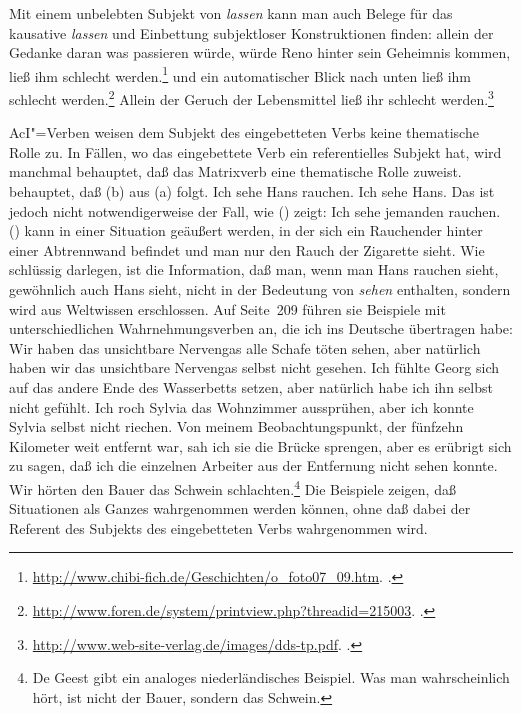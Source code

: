 Mit einem unbelebten Subjekt von \emph{lassen} kann man auch Belege für
das kausative \emph{lassen} und Einbettung subjektloser Konstruktionen finden:
\eal
\ex allein der Gedanke daran was passieren würde, würde Reno hinter sein Geheimnis kommen, ließ ihm schlecht werden.\footnote{%
\url{http://www.chibi-fich.de/Geschichten/o_foto07_09.htm}. .%
}
\ex und ein automatischer Blick nach unten ließ ihm schlecht werden.\footnote{
\url{http://www.foren.de/system/printview.php?threadid=215003}. .
}
\ex Allein der Geruch der Lebensmittel ließ ihr schlecht werden.\footnote{
\url{http://www.web-site-verlag.de/images/dds-tp.pdf}. .
}
\zl


\noindent
\label{page-start-aci-verbs-role}%
AcI"=Verben weisen dem Subjekt des eingebetteten Verbs keine thematische Rolle zu.
In Fällen, wo das eingebettete Verb ein referentielles Subjekt hat, wird manchmal
behauptet, daß das Matrixverb eine thematische Rolle zuweist.
\citet[]{Eisenberg94a} \zb behauptet, daß
(b) aus (a) folgt.
\eal
\ex{}
Ich sehe Hans rauchen.
\ex 
Ich sehe Hans.
\zl
Das ist jedoch nicht notwendigerweise der Fall, wie () zeigt:
\ea 
Ich sehe jemanden rauchen.
\z
() kann in einer Situation geäußert werden, in der sich ein Rauchender hinter einer Abtrennwand befindet
und man nur den Rauch der Zigarette sieht.
Wie \citet{KT76a} schlüssig darlegen, ist die Information, 
daß man, wenn man Hans rauchen sieht, gewöhnlich auch Hans sieht, 
nicht in der Bedeutung von \emph{sehen} enthalten, sondern wird
aus Weltwissen erschlossen.
Auf Seite~209 führen sie Beispiele mit unterschiedlichen Wahrnehmungsverben an, die ich
ins Deutsche übertragen habe:
\eal
\ex Wir haben das unsichtbare Nervengas alle Schafe töten sehen, aber natürlich haben
      wir das unsichtbare Nervengas selbst nicht gesehen.
%
\ex Ich fühlte Georg sich auf das andere Ende des Wasserbetts setzen, aber
      natürlich habe ich ihn selbst nicht gefühlt.
%
\ex Ich roch Sylvia das Wohnzimmer aussprühen, aber ich konnte Sylvia selbst nicht riechen.
%
\ex Von meinem Beobachtungspunkt, der fünfzehn Kilometer weit entfernt war,
      sah ich sie die Brücke sprengen, aber es erübrigt sich zu sagen, daß
      ich die einzelnen Arbeiter aus der Entfernung nicht sehen konnte.
\ex Wir hörten den Bauer das Schwein schlachten.\footnote{
        De Geest \citeyearpar[]{deGeest70a} gibt ein analoges niederländisches
        Beispiel. Was man wahrscheinlich hört, ist nicht der Bauer, sondern das Schwein.
      }
\zl
Die Beispiele zeigen, daß Situationen als Ganzes wahrgenommen werden können, ohne daß dabei
der Referent des Subjekts des eingebetteten Verbs wahrgenommen wird.%
\label{page-end-aci-verbs-role}%

